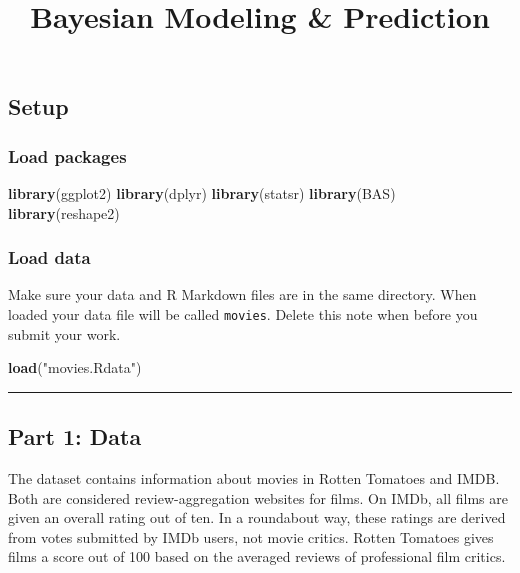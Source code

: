 \documentclass[]{article}
\title{Bayesian Modeling \& Prediction}
\author{}
\date{}
\newenvironment{Shaded}{\begin{snugshade}}{\end{snugshade}}
\newcommand{\KeywordTok}[1]{\textcolor[rgb]{0.13,0.29,0.53}{\textbf{#1}}}
\newcommand{\StringTok}[1]{\textcolor[rgb]{0.31,0.60,0.02}{#1}}
\newcommand{\NormalTok}[1]{#1}
\begin{document}
\maketitle

\subsection{Setup}\label{setup}

\subsubsection{Load packages}\label{load-packages}

\begin{Shaded}
\begin{Highlighting}[]
\KeywordTok{library}\NormalTok{(ggplot2)}
\KeywordTok{library}\NormalTok{(dplyr)}
\KeywordTok{library}\NormalTok{(statsr)}
\KeywordTok{library}\NormalTok{(BAS)}
\KeywordTok{library}\NormalTok{(reshape2)}
\end{Highlighting}
\end{Shaded}

\subsubsection{Load data}\label{load-data}

Make sure your data and R Markdown files are in the same directory. When
loaded your data file will be called \texttt{movies}. Delete this note
when before you submit your work.

\begin{Shaded}
\begin{Highlighting}[]
\KeywordTok{load}\NormalTok{(}\StringTok{"movies.Rdata"}\NormalTok{)}
\end{Highlighting}
\end{Shaded}

\begin{center}\rule{0.5\linewidth}{\linethickness}\end{center}

\subsection{Part 1: Data}\label{part-1-data}

The dataset contains information about movies in Rotten Tomatoes and
IMDB. Both are considered review-aggregation websites for films. On
IMDb, all films are given an overall rating out of ten. In a roundabout
way, these ratings are derived from votes submitted by IMDb users, not
movie critics. Rotten Tomatoes gives films a score out of 100 based on
the averaged reviews of professional film critics.
\end{document}
